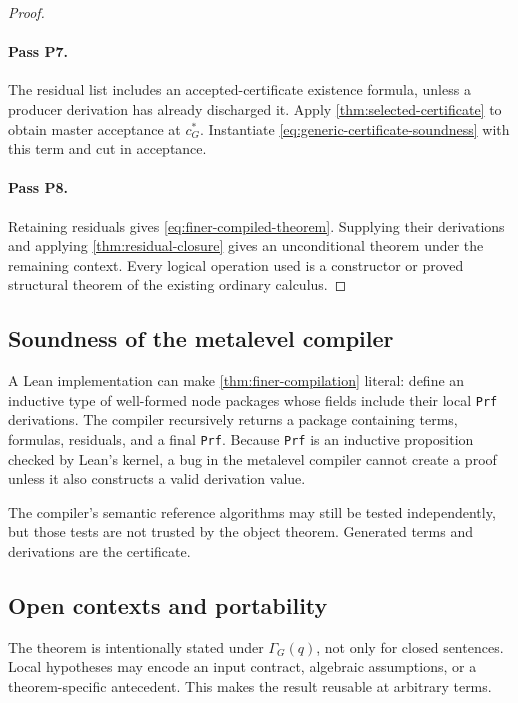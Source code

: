 \begin{proof}
\paragraph{Pass P7.}
The residual list includes an accepted-certificate existence formula, unless a producer derivation has already discharged it.  Apply \cref{thm:selected-certificate} to obtain master acceptance at \(c_G^*\).  Instantiate \eqref{eq:generic-certificate-soundness} with this term and cut in acceptance.

\paragraph{Pass P8.}
Retaining residuals gives \eqref{eq:finer-compiled-theorem}.  Supplying their derivations and applying \cref{thm:residual-closure} gives an unconditional theorem under the remaining context.  Every logical operation used is a constructor or proved structural theorem of the existing ordinary calculus.
\end{proof}

\subsection{Soundness of the metalevel compiler}

A Lean implementation can make \cref{thm:finer-compilation} literal: define an inductive type of well-formed node packages whose fields include their local \texttt{Prf} derivations.  The compiler recursively returns a package containing terms, formulas, residuals, and a final \texttt{Prf}.  Because \texttt{Prf} is an inductive proposition checked by Lean's kernel, a bug in the metalevel compiler cannot create a proof unless it also constructs a valid derivation value.

The compiler's semantic reference algorithms may still be tested independently, but those tests are not trusted by the object theorem.  Generated terms and derivations are the certificate.

\subsection{Open contexts and portability}

The theorem is intentionally stated under \(\Gamma_G(q)\), not only for closed sentences.  Local hypotheses may encode an input contract, algebraic assumptions, or a theorem-specific antecedent.  This makes the result reusable at arbitrary terms.

